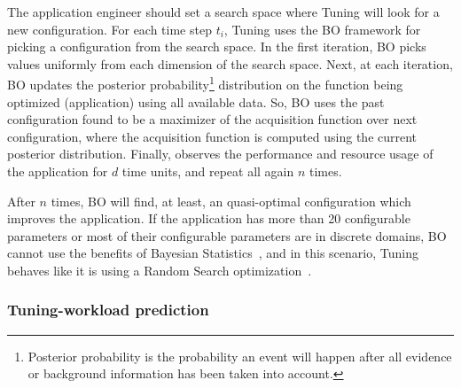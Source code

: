 

The application engineer should set a search space where Tuning will look for a
new configuration. For each time step $t_i$, Tuning uses the BO framework for
picking a configuration from the search space. In the first iteration, BO picks
values uniformly from each dimension of the search space. Next, at each
iteration, BO updates the posterior probability\footnote{Posterior probability is
the probability an event will happen after all evidence or background
information has been taken into account.} distribution on the function being
optimized (application) using all available data. So, BO uses the past
configuration found to be a maximizer of the acquisition function over next
configuration, where the acquisition function is computed using the current
posterior distribution. Finally, observes the performance and resource usage of
the application for $d$ time units, and repeat all again $n$ times.

After $n$ times, BO will find, at least, an quasi-optimal configuration which
improves the application. If the application has more than 20 configurable
parameters or most of their configurable parameters are in discrete domains, BO
cannot use the benefits of Bayesian Statistics~\cite{?}, and in this scenario,
Tuning behaves like it is using a Random Search optimization~\cite{?}.

\subsubsection{Tuning-workload prediction}

